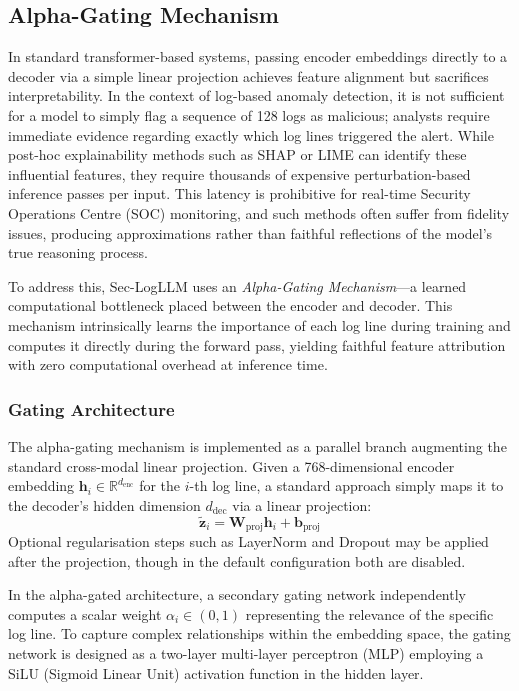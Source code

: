 \subsection{Alpha-Gating Mechanism}\label{sec:alpha-gating}

In standard transformer-based systems, passing encoder embeddings directly to a decoder via a simple linear projection achieves feature alignment but sacrifices interpretability. In the context of log-based anomaly detection, it is not sufficient for a model to simply flag a sequence of 128 logs as malicious; analysts require immediate evidence regarding exactly which log lines triggered the alert. While post-hoc explainability methods such as SHAP or LIME can identify these influential features, they require thousands of expensive perturbation-based inference passes per input. This latency is prohibitive for real-time Security Operations Centre (SOC) monitoring, and such methods often suffer from fidelity issues, producing approximations rather than faithful reflections of the model's true reasoning process.

To address this, Sec-LogLLM uses an \textit{Alpha-Gating Mechanism}—a learned computational bottleneck placed between the encoder and decoder. This mechanism intrinsically learns the importance of each log line during training and computes it directly during the forward pass, yielding faithful feature attribution with zero computational overhead at inference time.

\subsubsection{Gating Architecture}

The alpha-gating mechanism is implemented as a parallel branch augmenting the standard cross-modal linear projection. Given a 768-dimensional encoder embedding $\mathbf{h}_i \in \mathbb{R}^{d_{\text{enc}}}$ for the $i$-th log line, a standard approach simply maps it to the decoder's hidden dimension $d_{\text{dec}}$ via a linear projection:
\begin{equation}
    \tilde{\mathbf{z}}_i = \mathbf{W}_{\text{proj}} \mathbf{h}_i + \mathbf{b}_{\text{proj}}
\end{equation}
Optional regularisation steps such as LayerNorm and Dropout may be applied after the projection, though in the default configuration both are disabled. 

In the alpha-gated architecture, a secondary gating network independently computes a scalar weight $\alpha_i \in (0,1)$ representing the relevance of the specific log line. To capture complex relationships within the embedding space, the gating network is designed as a two-layer multi-layer perceptron (MLP) employing a SiLU (Sigmoid Linear Unit) activation function in the hidden layer.


